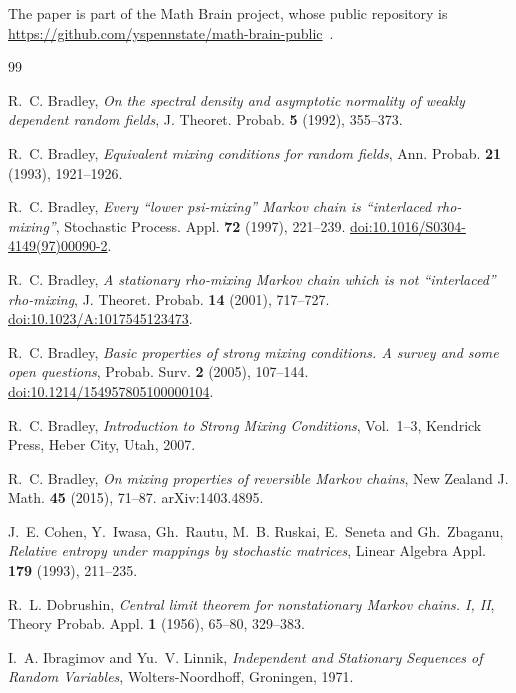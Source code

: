 \documentclass[11pt]{amsart}
\numberwithin{equation}{section}
\theoremstyle{definition}
\begin{document}
The paper is part of the Math Brain project, whose public repository is \url{https://github.com/yspennstate/math-brain-public}~\cite{MathBrainRepo}.

\begin{thebibliography}{99}

R.~C. Bradley, \emph{On the spectral density and asymptotic normality of weakly dependent random fields}, J. Theoret. Probab. \textbf{5} (1992), 355--373.

R.~C. Bradley, \emph{Equivalent mixing conditions for random fields}, Ann. Probab. \textbf{21} (1993), 1921--1926.

R.~C. Bradley, \emph{Every ``lower psi-mixing'' Markov chain is ``interlaced rho-mixing''}, Stochastic Process. Appl. \textbf{72} (1997), 221--239. \href{https://doi.org/10.1016/S0304-4149(97)00090-2}{doi:10.1016/S0304-4149(97)00090-2}.

R.~C. Bradley, \emph{A stationary rho-mixing Markov chain which is not ``interlaced'' rho-mixing}, J. Theoret. Probab. \textbf{14} (2001), 717--727. \href{https://doi.org/10.1023/A:1017545123473}{doi:10.1023/A:1017545123473}.

R.~C. Bradley, \emph{Basic properties of strong mixing conditions. A survey and some open questions}, Probab. Surv. \textbf{2} (2005), 107--144. \href{https://doi.org/10.1214/154957805100000104}{doi:10.1214/154957805100000104}.

R.~C. Bradley, \emph{Introduction to Strong Mixing Conditions}, Vol.~1--3, Kendrick Press, Heber City, Utah, 2007.

R.~C. Bradley, \emph{On mixing properties of reversible Markov chains}, New Zealand J. Math. \textbf{45} (2015), 71--87. arXiv:1403.4895.

J.~E. Cohen, Y.~Iwasa, Gh.~Rautu, M.~B. Ruskai, E.~Seneta and Gh.~Zbaganu, \emph{Relative entropy under mappings by stochastic matrices}, Linear Algebra Appl. \textbf{179} (1993), 211--235.

R.~L. Dobrushin, \emph{Central limit theorem for nonstationary Markov chains. I, II}, Theory Probab. Appl. \textbf{1} (1956), 65--80, 329--383.

I.~A. Ibragimov and Yu.~V. Linnik, \emph{Independent and Stationary Sequences of Random Variables}, Wolters-Noordhoff, Groningen, 1971.


\end{thebibliography}
\end{document}
